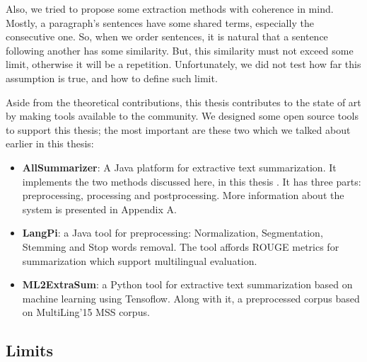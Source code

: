 \documentclass[12pt, oneside, a4paper]{article}
\begin{document}
Also, we tried to propose some extraction methods with coherence in mind. 
Mostly, a paragraph's sentences have some shared terms, especially the consecutive one. 
So, when we order sentences, it is natural that a sentence following another has some similarity. 
But, this similarity must not exceed some limit, otherwise it will be a repetition. 
Unfortunately, we did not test how far this assumption is true, and how to define such limit.

Aside from the theoretical contributions, this thesis contributes to the state of art by making tools available to the community. 
We designed some open source tools to support this thesis; the most important are these two which we talked about earlier in this thesis:
\begin{itemize}
	\item \textbf{AllSummarizer}: A Java platform for extractive text summarization. 
	It implements the two methods discussed here, in this thesis \citep{13-aries-al,15-aries-al}.
	It has three parts: preprocessing, processing and postprocessing. 
	More information about the system is presented in Appendix A.
	
	\item \textbf{LangPi}: a Java tool for preprocessing: Normalization, Segmentation, Stemming and Stop words removal.
	The tool affords ROUGE metrics for summarization which support multilingual evaluation. 
	
	\item \textbf{ML2ExtraSum}: a Python tool for extractive text summarization based on machine learning using Tensoflow. 
	Along with it, a preprocessed corpus based on MultiLing'15 MSS corpus.
	
\end{itemize}

\subsection{Limits}
\end{document}
